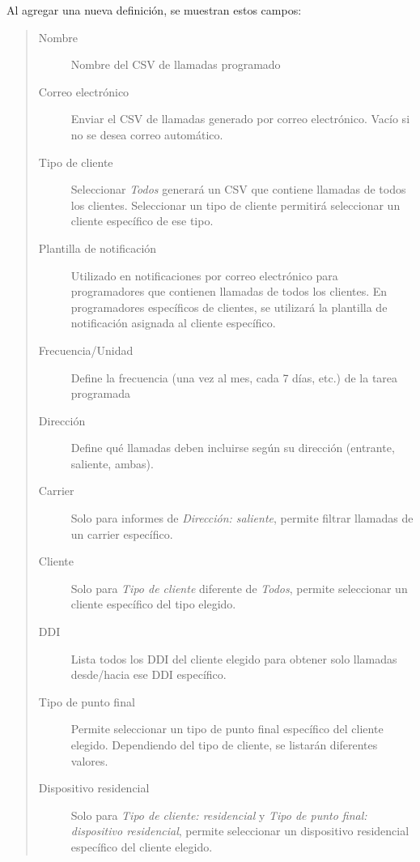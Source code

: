 \documentclass[letterpaper,10pt,spanish]{sphinxmanual}
\begin{document}
Al agregar una nueva definición, se muestran estos campos:
\begin{quote}
\begin{description}
\item[{Nombre}] \leavevmode
Nombre del CSV de llamadas programado

\item[{Correo electrónico}] \leavevmode
Enviar el CSV de llamadas generado por correo electrónico. Vacío si no se desea correo automático.

\item[{Tipo de cliente}] \leavevmode
Seleccionar \emph{Todos} generará un CSV que contiene llamadas de todos los clientes. Seleccionar un tipo de cliente permitirá seleccionar un cliente específico de ese tipo.

\item[{Plantilla de notificación}] \leavevmode
Utilizado en notificaciones por correo electrónico para programadores que contienen llamadas de todos los clientes. En programadores específicos de clientes, se utilizará la plantilla de notificación asignada al cliente específico.

\item[{Frecuencia/Unidad}] \leavevmode
Define la frecuencia (una vez al mes, cada 7 días, etc.) de la tarea programada

\item[{Dirección}] \leavevmode
Define qué llamadas deben incluirse según su dirección (entrante, saliente, ambas).

\item[{Carrier}] \leavevmode
Solo para informes de \emph{Dirección: saliente}, permite filtrar llamadas de un carrier específico.

\item[{Cliente}] \leavevmode
Solo para \emph{Tipo de cliente} diferente de \emph{Todos}, permite seleccionar un cliente específico del tipo elegido.

\item[{DDI}] \leavevmode
Lista todos los DDI del cliente elegido para obtener solo llamadas desde/hacia ese DDI específico.

\item[{Tipo de punto final}] \leavevmode
Permite seleccionar un tipo de punto final específico del cliente elegido. Dependiendo del tipo de cliente, se listarán diferentes valores.

\item[{Dispositivo residencial}] \leavevmode
Solo para \emph{Tipo de cliente: residencial} y \emph{Tipo de punto final: dispositivo residencial}, permite seleccionar un dispositivo residencial específico del cliente elegido.


\end{description}
\end{quote}
\end{document}
